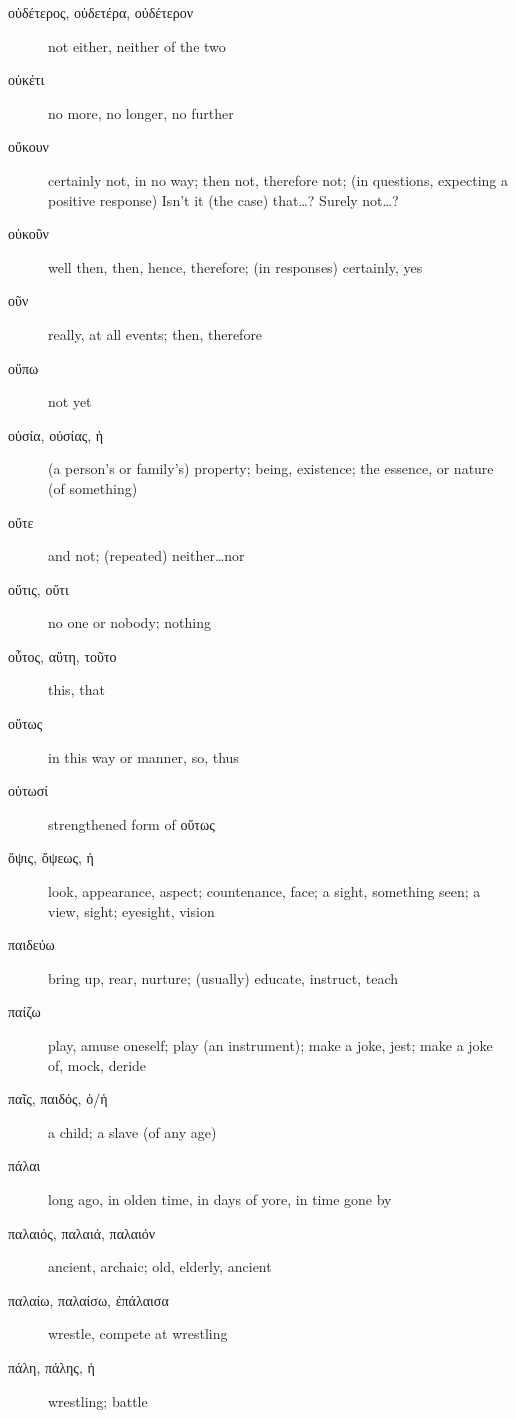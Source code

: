 \documentclass[12pt,letterpaper]{article}
\begin{document}
\begin{description}
    \item[\textgreek{οὐδέτερος, οὐδετέρα, οὐδέτερον}] not either, neither of the two
    \item[\textgreek{οὐκέτι}] \marginnote{*}no more, no longer, no further
    \item[\textgreek{οὔκουν}] certainly not, in no way; then not, therefore not; (in questions, expecting a positive response) Isn't it (the case) that\dots ? Surely not\dots ?
    \item[\textgreek{οὐκοῦν}] \marginnote{*}well then, then, hence, therefore; (in responses) certainly, yes
    \item[\textgreek{οῦν}] \marginnote{*}really, at all events; then, therefore
    \item[\textgreek{οὔπω}] not yet
    \item[\textgreek{οὐσία, οὐσίας, ἡ}] \marginnote{*}(a person's or family's) property; being, existence; the essence, or nature (of something)
    \item[\textgreek{οὔτε}] \marginnote{*}and not; (repeated) neither\dots nor
    \item[\textgreek{οὔτις, οὔτι}] no one or nobody; nothing
    \item[\textgreek{οὗτος, αὕτη, τοῦτο}] \marginnote{*}this, that
    \item[\textgreek{οὕτως}] \marginnote{*}in this way or manner, so, thus
    \item[\textgreek{οὑτωσί}] \marginnote{*}strengthened form of \textgreek{οὕτως}
    \item[\textgreek{ὄψις, ὄψεως, ἡ}] look, appearance, aspect; countenance, face; a sight, something seen; a view, sight; eyesight, vision
    \item[\textgreek{παιδεύω}] bring up, rear, nurture; (usually) educate, instruct, teach
    \item[\textgreek{παίζω}] play, amuse oneself; play (an instrument); make a joke, jest; make a joke of, mock, deride
    \item[\textgreek{παῖς, παιδός, ὁ/ἡ}] \marginnote{*}a child; a slave (of any age)
    \item[\textgreek{πάλαι}] long ago, in olden time, in days of yore, in time gone by
    \item[\textgreek{παλαιός, παλαιά, παλαιόν}] \marginnote{*}ancient, archaic; old, elderly, ancient
    \item[\textgreek{παλαίω, παλαίσω, ἐπάλαισα}] wrestle, compete at wrestling
    \item[\textgreek{πάλη, πάλης, ἡ}] wrestling; battle

\end{description}
\end{document}
